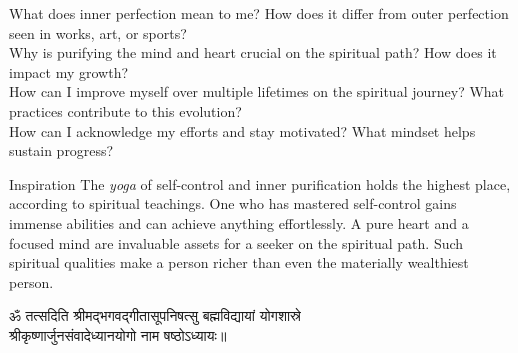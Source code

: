 \newpage
\begin{mananam}{}
\mananamtext What does inner perfection mean to me? How does it differ from outer perfection seen in works, art, or sports?\\
Why is purifying the mind and heart crucial on the spiritual path? How does it impact my growth?\\
How can I improve myself over multiple lifetimes on the spiritual journey? What practices contribute to this evolution?\\
How can I acknowledge my efforts and stay motivated? What mindset helps sustain progress?

\end{mananam}
\WritingHand{}
\begin{inspiration}{\mananamfont Inspiration}
\mananamtext The \emph{yoga} of self-control and inner purification holds the highest place, according to spiritual teachings. One who has mastered self-control gains immense abilities and can achieve anything effortlessly. A pure heart and a focused mind are invaluable assets for a seeker on the spiritual path. Such spiritual qualities make a person richer than even the materially wealthiest person.  
\end{inspiration}
\newpage

\newpage
\begin{center}
  {\devfont ॐ तत्सदिति श्रीमद्भगवद्गीतासूपनिषत्सु बह्मविद्यायां योगशास्रे\\
  श्रीकृष्णार्जुनसंवादेध्यानयोगो नाम षष्ठोऽध्यायः॥\\}
\end{center}
\newpage